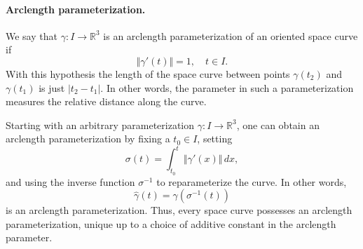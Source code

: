 \documentclass{article}
\newcommand{\reals}{\mathbb{R}}
\begin{document}
\paragraph{Arclength parameterization.}
We say that $\gamma:I\to\reals^3$ is an arclength parameterization of an
oriented space curve if 
$$\Vert \gamma'(t) \Vert = 1,\quad t\in I.$$
With this hypothesis the
length of the space curve between points $\gamma(t_2)$ and $\gamma(t_1)$ is
just $\vert t_2-t_1 \vert$.  In other words, the parameter in such a
parameterization measures the relative distance along the
curve. 

Starting with an arbitrary parameterization $\gamma: I\to \reals^3$,
one can obtain an arclength parameterization by fixing a $t_0\in I$,
setting
$$\sigma(t) = \int^t_{t_0} \Vert \gamma'(x)\Vert \, dx,$$
and using the
inverse function $\sigma^{-1}$ to reparameterize the curve.  In other
words,
$$\hat{\gamma}(t) = \gamma(\sigma^{-1}(t))$$
is an arclength
parameterization.  Thus, every space curve possesses an arclength
parameterization, unique up to a choice of additive constant in the
arclength parameter.
\end{document}
